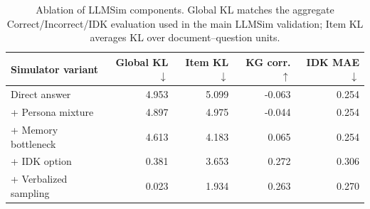 \begin{table}[t]
\centering
\small
\begin{tabular}{lrrrr}
\toprule
Simulator variant & Global KL $\downarrow$ & Item KL $\downarrow$ & KG corr. $\uparrow$ & IDK MAE $\downarrow$ \\
\midrule
Direct answer & 4.953 & 5.099 & -0.063 & 0.254 \\
+ Persona mixture & 4.897 & 4.975 & -0.044 & 0.254 \\
+ Memory bottleneck & 4.613 & 4.183 & 0.065 & 0.254 \\
+ IDK option & 0.381 & 3.653 & 0.272 & 0.306 \\
+ Verbalized sampling & 0.023 & 1.934 & 0.263 & 0.270 \\
\bottomrule
\end{tabular}
\caption{Ablation of LLMSim components. Global KL matches the aggregate Correct/Incorrect/IDK evaluation used in the main LLMSim validation; Item KL averages KL over document--question units.}
\label{tab:llmsim_ablation}
\end{table}
